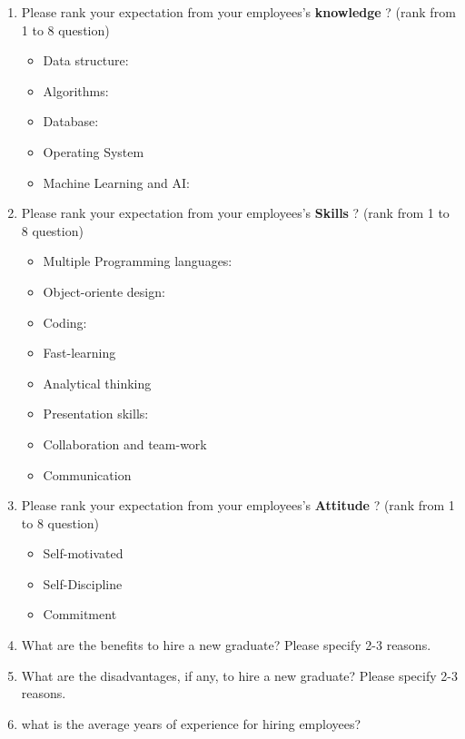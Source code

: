 \documentclass[12pt,a4paper,titlepage]{article}
\begin{document}
\begin{enumerate}
	\item Please rank your expectation from your employees's \textbf{knowledge} ? (rank from 1 to 8 question)
	\begin{itemize}
		\item Data structure:
		\item Algorithms:
		\item Database:
		\item Operating System
		\item Machine Learning and AI:
	\end{itemize}
	
	\item Please rank your expectation from your employees's \textbf{Skills} ? (rank from 1 to 8 question)
	\begin{itemize}
		\item Multiple Programming languages:
		\item Object-oriente design:
		\item Coding:
		\item Fast-learning
		\item Analytical thinking
		\item Presentation skills:
		\item Collaboration and team-work
		\item Communication
	\end{itemize}
	
	\item Please rank your expectation from your employees's \textbf{Attitude} ? (rank from 1 to 8 question)
	\begin{itemize}
		\item Self-motivated
		\item Self-Discipline
		\item Commitment
	\end{itemize}
	
	\item What are the benefits to hire a new graduate? Please specify 2-3 reasons.
	
	\item What are the disadvantages, if any, to hire a new graduate? Please specify 2-3 reasons.
	
	\item what is the average years of experience for hiring employees?
	


\end{enumerate}


{}

\end{document}
